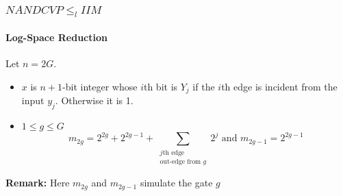 \documentclass[article,10pt]{beamer}%
\begin{document}
\begin{frame}

\frametitle{$NANDCVP\leq_l IIM$}
\framesubtitle{Log-Space Reduction}
Let $n=2G$. %
\begin{itemize}
	\item $x$ is $n+1$-bit integer whose $i$th bit is $Y_j$ if the $i$th edge is incident from the input $y_j$. Otherwise it is 1.
	\item $1\leq g\leq G$  $$m_{2g}=2^{2g}+2^{2g-1}+\sum_{\substack{j\text{th edge}\\ \text{out-edge from }g}}2^j\text{ and }m_{2g-1}=2^{2g-1}$$
\end{itemize}
\vspace{2mm}
\textbf{Remark:} Here $m_{2g}$ and $m_{2g-1}$ simulate the gate $g$
\end{frame}
\end{document}
